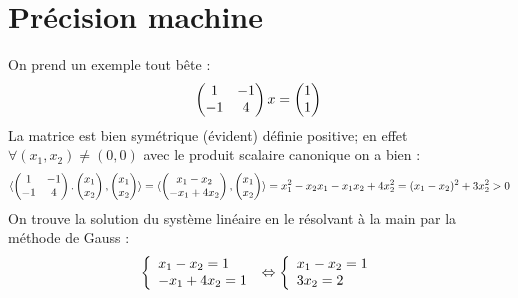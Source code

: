\documentclass[a4paper, titlepage]{livret}													%
\begin{document}
	\section{Précision machine}
		On prend un exemple tout bête :
			\[
				\begin{pmatrix}
					1 & -1 \\
					-1 & 4 \\
				\end{pmatrix}
				x =
				\begin{pmatrix}
					1 \\
					1 \\
				\end{pmatrix} \\
			\]
		La matrice est bien symétrique (évident) définie positive; en effet $\forall (x_{1}, x_{2}) \neq (0, 0)$ avec le produit scalaire canonique on a bien :
			\[
				\langle
				\begin{pmatrix}
					1 & -1 \\
					-1 & 4 \\
				\end{pmatrix}.
				\begin{pmatrix}
					x_{1} \\
					x_{2} \\
				\end{pmatrix},
				\begin{pmatrix}
					x_{1} \\
					x_{2} \\
				\end{pmatrix}
				\rangle \\ =
				\langle
				\begin{pmatrix}
					x_{1} - x_{2} \\
					-x_{1} + 4x_{2} \\
				\end{pmatrix},
				\begin{pmatrix}
					x_{1} \\
					x_{2} \\
				\end{pmatrix}
				\rangle \\ =
				x_{1}^{2} -x_{2}x_{1} -x_{1}x_{2} + 4x_{2}^{2} =
				(x_{1} - x_{2})^{2} + 3x_{2}^{2} > 0
			\]
		On trouve la solution du système linéaire en le résolvant à la main par la méthode de Gauss :
			\[
				\left\{
				\begin{array}{ll}
					x_{1} - x_{2} = 1 \\
					- x_{1} + 4x_{2} = 1 \\
				\end{array} \right. \\
				\Leftrightarrow
				\left\{
				\begin{array}{ll}
					x_{1} - x_{2} = 1 \\
					3x_{2} = 2 \\
				\end{array} \right. \\
			\]
\end{document}
